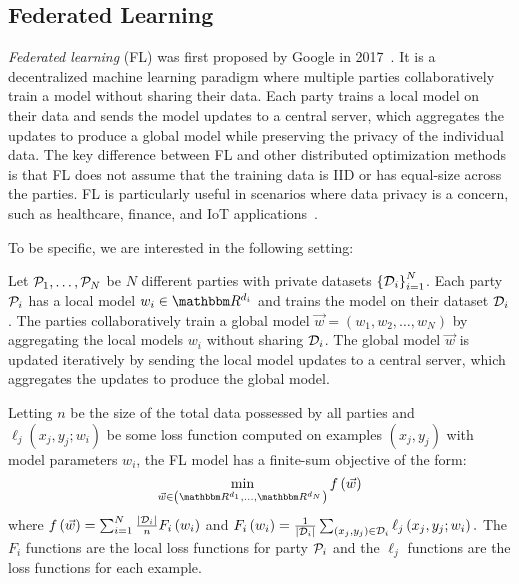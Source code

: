 \subsection{Federated Learning}
\emph{Federated learning} (FL) was first proposed by Google in 2017~\cite{mcmahan2017communication}.
It is a decentralized machine learning paradigm where multiple parties collaboratively train a model without sharing their data.
Each party trains a local model on their data and sends the model updates to a central server, which aggregates the updates to produce a global model while preserving the privacy of the individual data.
The key difference between FL and other distributed optimization methods is that FL does not assume that the training data is IID or has equal-size across the parties. 
FL is particularly useful in scenarios where data privacy is a concern, such as healthcare, finance, and IoT applications~\cite{sheller2020federated, li2020review, yuan2020federated, xu2021federated, nevrataki2023survey, bhatti2024enhancing}.

To be specific, we are interested in the following setting:
\begin{definition}
		Let $\mathcal{P}_1, \ldots, \mathcal{P}_N$ be $N$ different parties with private datasets $\left\{\mathcal{D}_i\right\}_{i = 1}^N$.
		Each party $\mathcal{P}_i$ has a local model $w_i\in \R^{d_i}$ and trains the model on their dataset $\mathcal{D}_i$.
		The parties collaboratively train a global model $\vec{w} = \left(w_1, w_2, \ldots, w_N\right)$ by aggregating the local models $w_i$ without sharing $\mathcal{D}_i$.
		The global model $\vec{w}$ is updated iteratively by sending the local model updates to a central server, which aggregates the updates to produce the global model.

		Letting $n$ be the size of the total data possessed by all parties and $\ell_j\left(x_j, y_j; w_i\right)$ be some loss function computed on examples $\left(x_j, y_j\right)$ with model parameters $w_i$, the FL model has a finite-sum objective of the form:
		\[\min_{\vec{w} \in \left(\R^{d_1}, \ldots, \R^{d_N}\right)} f\left(\vec{w}\right)\]
		where $f\left(\vec{w}\right) = \sum_{i = 1}^N \frac{\left|\mathcal{D}_i\right|}{n} F_i\left(w_i\right)$ and $F_i\left(w_i\right) = \frac{1}{\left|\mathcal{D}_i\right|} \sum_{\left(x_j, y_j\right) \in \mathcal{D}_i}\ell_j\left(x_j, y_j;w_i\right).$
		The $F_i$ functions are the local loss functions for party $\mathcal{P}_i$ and the $\ell_j$ functions are the loss functions for each example.

	\end{definition}

